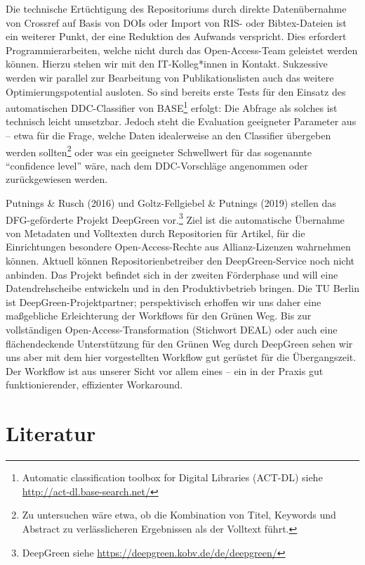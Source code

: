\documentclass[a4paper,
fontsize=11pt,
oneside,
numbers=noperiodatend,
parskip=half-,
bibliography=totoc,
final
]{scrartcl}
\begin{document}
Die technische Ertüchtigung des Repositoriums durch direkte
Datenübernahme von Crossref auf Basis von DOIs oder Import von RIS- oder
Bibtex-Dateien ist ein weiterer Punkt, der eine Reduktion des Aufwands
verspricht. Dies erfordert Programmierarbeiten, welche nicht durch das
Open-Access-Team geleistet werden können. Hierzu stehen wir mit den
IT-Kolleg*innen in Kontakt. Sukzessive werden wir parallel zur
Bearbeitung von Publikationslisten auch das weitere
Optimierungspotential ausloten. So sind bereits erste Tests für den
Einsatz des automatischen DDC-Classifier von BASE\footnote{Automatic
  classification toolbox for Digital Libraries (ACT-DL) siehe
  \url{http://act-dl.base-search.net/}} erfolgt: Die Abfrage als solches
ist technisch leicht umsetzbar. Jedoch steht die Evaluation geeigneter
Parameter aus -- etwa für die Frage, welche Daten idealerweise an den
Classifier übergeben werden sollten\footnote{Zu untersuchen wäre etwa,
  ob die Kombination von Titel, Keywords und Abstract zu verlässlicheren
  Ergebnissen als der Volltext führt.} oder was ein geeigneter
Schwellwert für das sogenannte \enquote{confidence level} wäre, nach dem
DDC-Vorschläge angenommen oder zurückgewiesen werden.

Putnings \& Rusch (2016) und Goltz-Fellgiebel \& Putnings (2019) stellen
das DFG-geförderte Projekt DeepGreen vor.\footnote{DeepGreen siehe
  \url{https://deepgreen.kobv.de/de/deepgreen/}} Ziel ist die
automatische Übernahme von Metadaten und Volltexten durch Repositorien
für Artikel, für die Einrichtungen besondere Open-Access-Rechte aus
Allianz-Lizenzen wahrnehmen können. Aktuell können Repositorienbetreiber
den DeepGreen-Service noch nicht anbinden. Das Projekt befindet sich in
der zweiten Förderphase und will eine Datendrehscheibe entwickeln und in
den Produktivbetrieb bringen. Die TU Berlin ist
Deep\-Green-Projektpartner; perspektivisch erhoffen wir uns daher eine
maßgebliche Erleichterung der Workflows für den Grünen Weg. Bis zur
vollständigen Open-Access-Transformation (Stichwort DEAL) oder auch eine
flächendeckende Unterstützung für den Grünen Weg durch DeepGreen sehen
wir uns aber mit dem hier vorgestellten Workflow gut gerüstet für die
Übergangszeit. Der Workflow ist aus unserer Sicht vor allem eines -- ein
in der Praxis gut funktionierender, effizienter Workaround.

\hypertarget{literatur}{%
\section*{Literatur}\label{literatur}}
\end{document}
